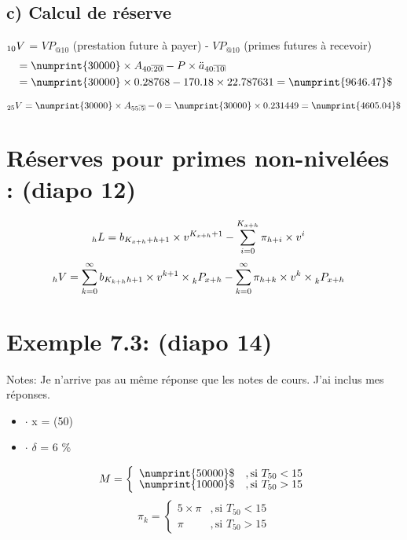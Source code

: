 \documentclass[11pt,french]{report}
\makeatletter
\DeclareRobustCommand{\annuity}[1]{%
\def\arraystretch{0}%
\setlength\arraycolsep{.7pt}%
\setlength\arrayrulewidth{.3pt}%
\begin{array}[b]{@{}c|}\hline
\\[\arraycolsep]%
\scriptstyle #1%
\end{array}%
}
\newcommand{\indiceGauche}[2]{{\vphantom{#2}}_{#1}#2}
\makeatother
\begin{document}
\subsection*{c) Calcul de réserve}
$\indiceGauche{10}{V}$ = $VP_{@10}$ (prestation future à payer) - $VP_{@10}$ (primes futures à recevoir) 
\begin{align*}
&= \numprint{30000}\times A_{40\annuity{:20}} - P \times \ddot{a}_{40\annuity{:10}} \\
&= \numprint{30000} \times 0.28768 - 170.18 \times 22.787631 = \numprint{9646.47}\$ \\
\end{align*}

$\indiceGauche{25}{V} = \numprint{30000} \times A_{55\annuity{:5}} - 0 = \numprint{30000} \times 0.231449 = \numprint{4605.04}\$ $  

\section{Réserves pour primes non-nivelées : (diapo 12)}
\begin{align*}
\indiceGauche{h}{L} &= b_{K_{x+h}+h+1} \times v^{K_{x+h}+1} - \sum_{i=0}^{K_{x+h}} \pi_{h+i}\times v^{i}
\end{align*}
\begin{align*}
\indiceGauche{h}{V} &= \sum_{k=0}^{\infty} b_{K_{k+h}h+1}\times v^{k+1}\times \indiceGauche{k}{P_{x+h}} - \sum_{k=0}^{\infty} \pi_{h+k}\times v^{k}\times \indiceGauche{k}{P_{x+h}}
\end{align*}

\section{Exemple 7.3: (diapo 14)}
\label{exemple7.3}
Notes: Je n'arrive pas au même réponse que les notes de cours. J'ai inclus mes réponses.
\begin{itemize}
\item $\cdot$ x = (50)
\item $\cdot$ $\delta$ = 6 \%
\end{itemize}
\begin{equation}
M =
     	\left\{
     	\begin{array}{rl}
     	\numprint{50000}\$ &, \text{si } T_{50} <15 \\
		\numprint{10000}\$ &, \text{si } T_{50} > 15
     	\end{array}
     	\right.	
\end{equation}
\begin{equation}
\pi_k =
     	\left\{
     	\begin{array}{rl}
     	5 \times \pi &, \text{si } T_{50} <15 \\
		  \pi &, \text{si } T_{50} > 15
     	\end{array}
     	\right.	
\end{equation}
\end{document}
